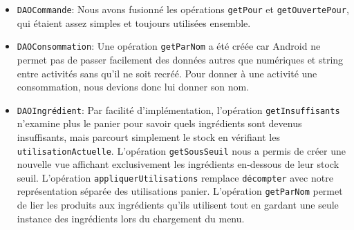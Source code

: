 \documentclass[a4paper,10pt]{article}
\begin{document}
\begin{itemize}
    \item \texttt{DAOCommande}: Nous avons fusionné les opérations \texttt{getPour} et \texttt{getOuvertePour}, qui étaient assez simples et toujours utilisées ensemble.
    \item \texttt{DAOConsommation}: Une opération \texttt{getParNom} a été créée car Android ne permet pas de passer facilement des données autres que numériques et string entre activités sans qu'il ne soit recréé. Pour donner à une activité une consommation, nous devions donc lui donner son nom.
    \item \texttt{DAOIngrédient}: Par facilité d'implémentation, l'opération \texttt{getInsuffisants} n'examine plus le panier pour savoir quels ingrédients sont devenus insuffisants, mais parcourt simplement le stock en vérifiant les \texttt{utilisationActuelle}. L'opération \texttt{getSousSeuil} nous a permis de créer une nouvelle vue affichant exclusivement les ingrédients en-dessous de leur stock seuil. L'opération \texttt{appliquerUtilisations} remplace \texttt{décompter} avec notre représentation séparée des utilisations panier. L'opération \texttt{getParNom} permet de lier les produits aux ingrédients qu'ils utilisent tout en gardant une seule instance des ingrédients lors du chargement du menu.
\end{itemize}
\end{document}
